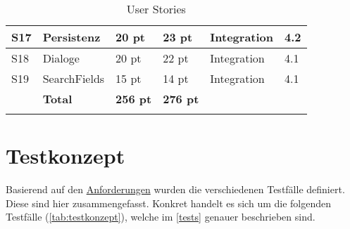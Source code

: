 \begin{longtable}{|p{0.6cm}|P{3.5cm}|p{1.4cm}|p{1.4cm}|p{2.4cm}|p{1.1cm}|}
S17 & Persistenz                         & 20 pt              & 23 pt               & Integration & 4.2 \\ \hline
S18 & Dialoge                            & 20 pt              & 22 pt               & Integration & 4.1 \\ \hline
S19 & SearchFields                       & 15 pt              & 14 pt               & Integration & 4.1 \\ \hline\hline
 & \textbf{Total}                       & \textbf{256 pt}             & \textbf{276 pt}               &  &  \\ \hline
    \caption{User Stories}
 \label{user-stories}
\end{longtable}

\section{Testkonzept}
Basierend auf den \hyperref[anforderungen]{Anforderungen} wurden die verschiedenen Testfälle definiert. Diese sind hier zusammengefasst. Konkret handelt es sich um die folgenden Testfälle (\autoref{tab:testkonzept}), welche im \autoref{tests} genauer beschrieben sind.

